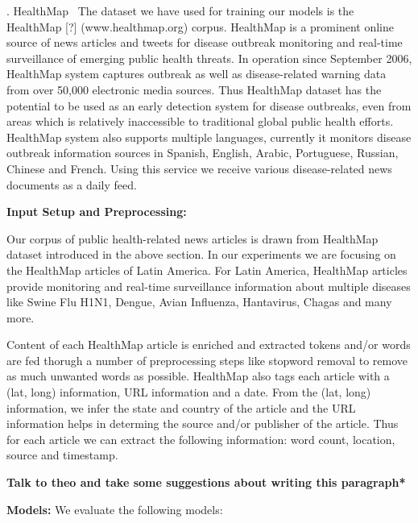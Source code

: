 \documentclass[conference]{IEEEtran}
\begin{document}
. HealthMap~\cite{healthmap}  The dataset we have used for training our models is the HealthMap [?] (www.healthmap.org) 
corpus. HealthMap is a prominent online source of news articles and tweets for 
disease outbreak monitoring and real-time surveillance of emerging public health
threats. In operation since September 2006, HealthMap system captures outbreak 
as well as disease-related warning data from over 50,000 electronic media sources.
Thus HealthMap dataset has the potential to be used as an early detection system for disease outbreaks,
even from areas which is relatively inaccessible to traditional global public health efforts.
HealthMap system also supports multiple languages, currently it monitors disease outbreak information
sources in Spanish, English, Arabic, Portuguese, Russian, Chinese and French. Using this service 
we receive various disease-related news documents as a daily feed.

{\bf Input Setup and Preprocessing:}

Our corpus of public health-related news articles is drawn from HealthMap dataset
introduced in the above section. In our experiments we are focusing on the HealthMap articles of 
Latin America.  For Latin America, HealthMap articles provide monitoring and real-time surveillance 
information about multiple diseases like Swine Flu H1N1, Dengue, Avian Influenza, Hantavirus, Chagas and many more.

Content of each HealthMap article is enriched and extracted tokens and/or words are fed thorugh a number of preprocessing steps 
like stopword removal to remove as much unwanted words as possible. HealthMap also 
tags each article with a (lat, long) information, URL information and a date. From the (lat, long) information, 
we infer the state and country of the article and the URL information
helps in determing the source and/or publisher of the article. Thus for each article we can extract the following information:
word count, location, source and timestamp. 

{\bf *Talk to theo and take some suggestions about writing this
paragraph*}




{\bf Models:} We evaluate the following models:
\end{document}
